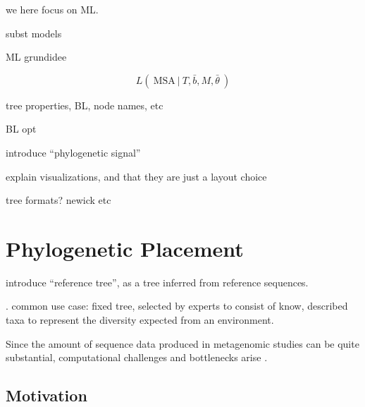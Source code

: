 we here focus on ML.

subst models

ML grundidee

\begin{equation}
    L(~ \mbox{MSA} ~|~ T, \bar{b}, M, \bar{\theta} ~)
\end{equation}



tree properties, BL, node names, etc

BL opt

introduce ``phylogenetic signal''

explain visualizations, and that they are just a layout choice

tree formats?
newick etc


\section{Phylogenetic Placement}
\label{ch:Foundations:sec:PhylogeneticPlacement}

introduce ``reference tree'', as a tree inferred from reference sequences.

. common use case: fixed tree, selected by experts to consist of know, described taxa
to represent the diversity expected from an environment.


Since the amount of sequence data produced in metagenomic studies can be quite substantial,
computational challenges and bottlenecks arise \cite{Scholz2012}.



\subsection{Motivation}
\label{ch:Foundations:sec:PhylogeneticPlacement:sub:Motivation}


